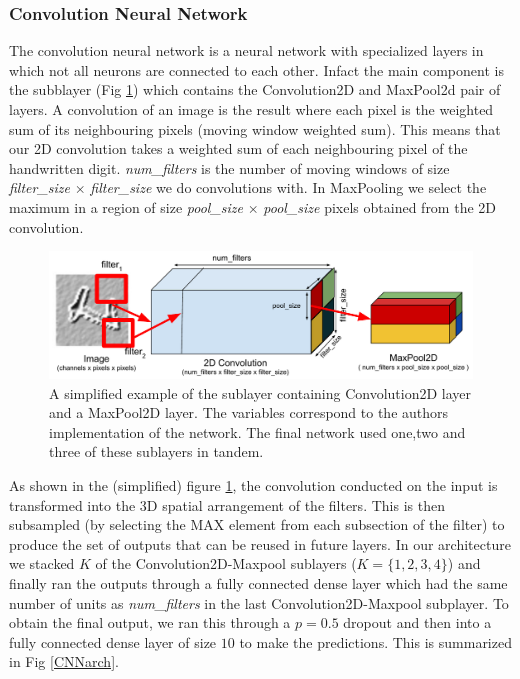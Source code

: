 \documentclass[conference]{IEEEtran}
\begin{document}
\subsubsection{Convolution Neural Network}
The convolution neural network \cite{LeCunn98} is a neural network with specialized layers in which not all neurons are connected to each other. Infact the main component is the subblayer (Fig \ref{convmaxlayer}) which contains the Convolution2D and MaxPool2d pair of layers. A convolution of an image is the result where each pixel is the weighted sum of its neighbouring pixels (moving window weighted sum). This means that our 2D convolution takes a weighted sum of each neighbouring pixel of the handwritten digit. \emph{num\_filters} is the number of moving windows of size \emph{filter\_size} $\times$ \emph{filter\_size} we do convolutions with. In MaxPooling we select the maximum in a region of size \emph{pool\_size} $\times$ \emph{pool\_size} pixels obtained from the 2D convolution.


\begin{figure}[h]

	\includegraphics[scale=0.40]{convnet_example.pdf}
	\caption{A simplified example of the sublayer containing Convolution2D layer and a MaxPool2D layer. The variables correspond to the authors implementation of the network. The final network used one,two and three of these sublayers in tandem.}
	\label{convmaxlayer}
\end{figure}

As shown in the (simplified) figure \ref{convmaxlayer}, the convolution conducted on the input is transformed into the 3D spatial arrangement of the filters. This is then subsampled (by selecting the MAX element from each subsection of the filter) to produce the set of outputs that can be reused in future layers. In our architecture we stacked $K$ of the Convolution2D-Maxpool sublayers ($K=\{1,2,3,4\}$) and finally ran the outputs through a fully connected dense layer which had the same number of units as \emph{num\_filters} in the last Convolution2D-Maxpool subplayer. To obtain the final output, we ran this through a $p=0.5$ dropout and then into a fully connected dense layer of size $10$ to make the predictions. This is summarized in Fig \ref{CNNarch}. 
\end{document}

